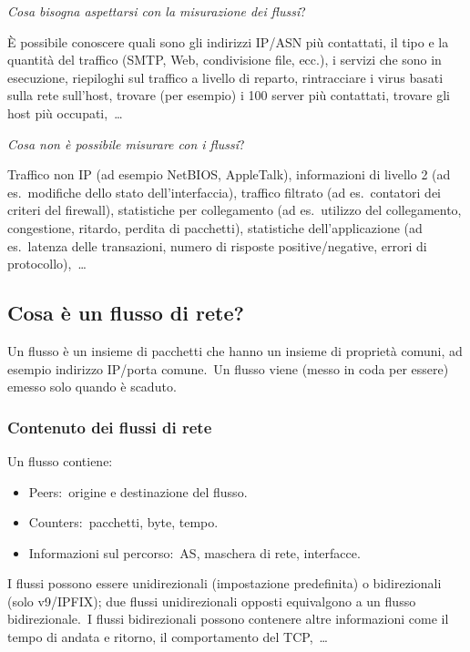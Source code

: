 \begin{center}
    \textit{Cosa bisogna aspettarsi con la misurazione dei flussi}?
\end{center}

\noindent È possibile conoscere quali sono gli indirizzi IP/ASN più contattati, il tipo e la quantità del traffico (SMTP, Web, condivisione file, ecc.), i servizi che sono in esecuzione, riepiloghi sul traffico a livello di reparto, rintracciare i virus basati sulla rete sull'host, trovare (per esempio) i 100 server più contattati, trovare gli host più occupati,\ \dots

\begin{center}
    \textit{Cosa non è possibile misurare con i flussi}?
\end{center}

\noindent Traffico non IP (ad esempio NetBIOS, AppleTalk), informazioni di livello 2 (ad es.\ modifiche dello stato dell'interfaccia), traffico filtrato (ad es.\ contatori dei criteri del firewall), statistiche per collegamento (ad es.\ utilizzo del collegamento, congestione, ritardo, perdita di pacchetti), statistiche dell'applicazione (ad es.\ latenza delle transazioni, numero di risposte positive/negative, errori di protocollo),\ \dots

\subsection{Cosa è un flusso di rete?}

Un flusso è un insieme di pacchetti che hanno un insieme di proprietà comuni, ad esempio indirizzo IP/porta comune.\
Un flusso viene (messo in coda per essere) emesso solo quando è scaduto.\

\subsubsection{Contenuto dei flussi di rete}

Un flusso contiene:
\begin{itemize}
    \item Peers:\ origine e destinazione del flusso.
    \item Counters:\ pacchetti, byte, tempo.
    \item Informazioni sul percorso:\ AS, maschera di rete, interfacce.
\end{itemize}

\noindent I flussi possono essere unidirezionali (impostazione predefinita) o bidirezionali (solo v9/IPFIX); due flussi unidirezionali opposti equivalgono a un flusso bidirezionale.\
I flussi bidirezionali possono contenere altre informazioni come il tempo di andata e ritorno, il comportamento del TCP,\ \dots

